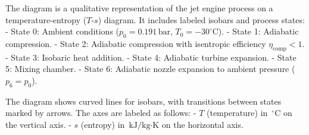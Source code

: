 The diagram is a qualitative representation of the jet engine process on a temperature-entropy (\( T \)-\( s \)) diagram. It includes labeled isobars and process states:  
- State 0: Ambient conditions (\( p_0 = 0.191 \, \text{bar} \), \( T_0 = -30^\circ\text{C} \)).  
- State 1: Adiabatic compression.  
- State 2: Adiabatic compression with isentropic efficiency \( \eta_{\text{comp}} < 1 \).  
- State 3: Isobaric heat addition.  
- State 4: Adiabatic turbine expansion.  
- State 5: Mixing chamber.  
- State 6: Adiabatic nozzle expansion to ambient pressure (\( p_6 = p_0 \)).  

The diagram shows curved lines for isobars, with transitions between states marked by arrows. The axes are labeled as follows:  
- \( T \) (temperature) in \( \, ^\circ\text{C} \) on the vertical axis.  
- \( s \) (entropy) in \( \, \text{kJ/kg·K} \) on the horizontal axis.